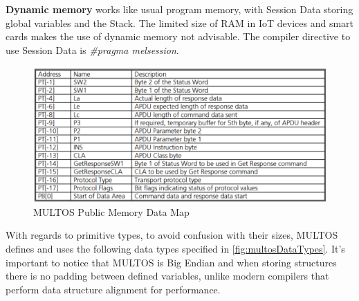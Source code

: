 \textbf{Dynamic memory} works like usual program memory, with Session Data storing global variables and the Stack. The limited size of RAM in IoT devices and smart cards makes the use of dynamic memory not advisable. The compiler directive to use Session Data is \textit{\#pragma melsession}.


\begin{figure}[bth]
	\begin{center}
		\includegraphics[width=\linewidth]{gfx/multosPubMem}
	\end{center}
	\caption{MULTOS Public Memory Data Map}
	\label{fig:multosPubMem}
\end{figure}


\hfil


With regards to primitive types, to avoid confusion with their sizes, MULTOS defines and uses the following data types specified in \autoref{fig:multosDataTypes}. It's important to notice that MULTOS is Big Endian
and when storing structures there is no padding between defined variables, unlike modern compilers that perform data structure alignment \citep{dataStructAlign} for performance.

